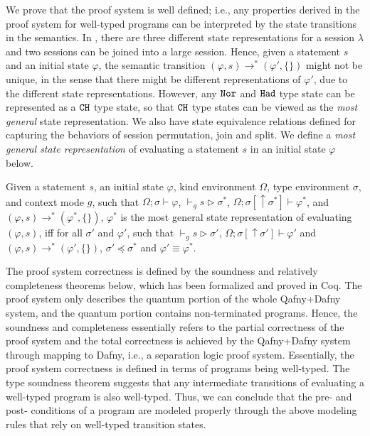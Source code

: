 We prove that the \qafny proof system is well defined; i.e., any properties derived in the \qafny proof system for well-typed \qafny programs can be interpreted by the state transitions in the \qafny semantics.
In \qafny, there are three different state representations for a session $\lambda$ and two sessions can be joined into a large session.
Hence, given a statement $s$ and an initial state $\varphi$, the semantic transition $(\varphi,s) \longrightarrow^{*} (\varphi',\{\})$ might not be unique, in the sense that there might be different representations of $\varphi'$, due to the different state representations.
However, any $\texttt{Nor}$ and $\texttt{Had}$ type state can be represented as a $\texttt{CH}$ type state, so that $\texttt{CH}$ type states can be viewed as the \emph{most general} state representation. We also have state equivalence relations defined for capturing the behaviors of session permutation, join and split. We define a \emph{most general state representation} of evaluating a statement $s$ in an initial state $\varphi$ below.

\begin{definition}\label{def:most-gen}\rm 
  Given a statement $s$, an initial state $\varphi$, kind environment $\Omega$, type environment $\sigma$, and context mode $g$, such that $\Omega;\sigma\vdash \varphi$, $\vdash_g s \triangleright \sigma^*$, $\Omega;\sigma[\uparrow \sigma^*]\vdash \varphi^*$, and $(\varphi,s) \longrightarrow^{*} (\varphi^*,\{\})$, $\varphi^*$ is the most general state representation of evaluating $(\varphi,s)$, iff for all $\sigma'$ and $\varphi'$, such that $\vdash_g s \triangleright \sigma'$, $\Omega;\sigma[\uparrow \sigma']\vdash \varphi'$ and $(\varphi,s) \longrightarrow^{*} (\varphi',\{\})$, $\sigma' \preceq \sigma^*$ and $\varphi' \equiv \varphi^*$.
\end{definition}

The \qafny proof system correctness is defined by the soundness and relatively completeness theorems below, which has been formalized and proved in Coq. The \qafny proof system only describes the quantum portion of the whole Qafny+Dafny system, and the quantum portion contains non-terminated programs. Hence, the soundness and completeness essentially refers to the partial correctness of the \qafny proof system and the total correctness is achieved by the Qafny+Dafny system through mapping \qafny to Dafny, i.e., a separation logic proof system. Essentially, the \qafny proof system correctness is defined in terms of programs being well-typed. The type soundness theorem suggests that any intermediate transitions of evaluating a well-typed \qafny program is also well-typed. Thus, we can conclude that the pre- and post- conditions of a program are modeled properly through the above modeling rules that rely on well-typed transition states.

